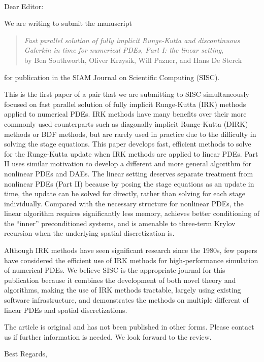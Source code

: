 \documentclass[12pt]{letter}
\date{}
\makeatletter
\renewcommand{\closing}[1]{\par\nobreak\vspace{\parskip}%
  \stopbreaks
  \noindent
  \ifx\@empty\fromaddress\else
  \hspace*{\longindentation}\fi
  \parbox{\indentedwidth}{\raggedright
       \ignorespaces #1\\[2\medskipamount]%
       \ifx\@empty\fromsig
           \fromname
       \else \fromsig \fi\strut}%
   \par}
\makeatother
\begin{document}
\vspace{-5ex}
\begin{letter}
\\
\opening{Dear Editor:}
\vspace{3ex}

We are writing to submit the manuscript
\begin{quote}
\emph{Fast parallel solution of fully implicit Runge-Kutta and discontinuous
  Galerkin in time for numerical PDEs, Part I: the linear setting},\\
by Ben Southworth, Oliver Krzysik, Will Pazner, and Hans De Sterck
\end{quote}
for publication in the SIAM Journal on Scientific Computing (SISC).

This is the first paper of a pair that we are submitting to SISC simultaneously
focused on fast parallel solution of fully implicit Runge-Kutta (IRK) methods applied
to numerical PDEs. IRK methods have many benefits over
their more commonly used counterparts such as diagonally implicit Runge-Kutta (DIRK)
methods or BDF methods, but are rarely used in practice due to the difficulty
in solving the stage equations. This paper develops fast, efficient methods to
solve for the Runge-Kutta update when IRK methods are applied to linear PDEs.
Part II uses similar motivation to develop a different and more general
algorithm for nonlinear PDEs and DAEs. The linear setting deserves separate treatment
from nonlinear PDEs (Part II) because by posing the stage equations as an
update in time, the update can be solved for directly, rather than solving for each
stage individually. Compared with the necessary structure for nonlinear
PDEs, the linear algorithm requires significantly less memory, achieves
better conditioning of the ``inner'' preconditioned systems, and is amenable
to three-term Krylov recursion when the underlying spatial discretization is.

Although IRK methods have seen significant research since the 1980s, few
papers have considered the efficient use of IRK methods for high-performance
simulation of numerical PDEs. We believe SISC is the appropriate journal for
this publication because it combines the development of both novel theory and
algorithms, making the use of IRK methods tractable, largely using existing
software infrastructure, and demonstrates the methods on multiple different
of linear PDEs and spatial discretizations.

The article is original and has not been published in other forms. Please
contact us if further information is needed. We look forward to the
review.\\

\closing{Best Regards,}


\end{letter}
\end{document}
